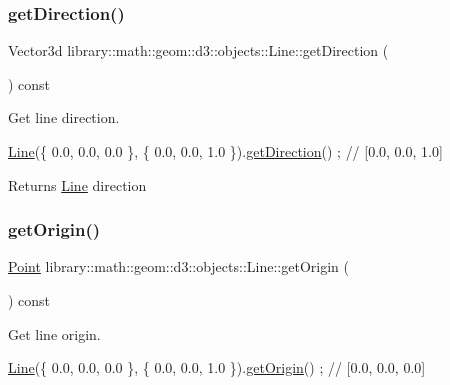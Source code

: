 \subsubsection{\texorpdfstring{get\+Direction()}{getDirection()}}
{\footnotesize\ttfamily Vector3d library\+::math\+::geom\+::d3\+::objects\+::\+Line\+::get\+Direction (\begin{DoxyParamCaption}{ }\end{DoxyParamCaption}) const}



Get line direction. 


\begin{DoxyCode}
\hyperlink{classlibrary_1_1math_1_1geom_1_1d3_1_1objects_1_1_line_a762e529453ff9ffa9233fd73737f4692}{Line}(\{ 0.0, 0.0, 0.0 \}, \{ 0.0, 0.0, 1.0 \}).\hyperlink{classlibrary_1_1math_1_1geom_1_1d3_1_1objects_1_1_line_aa108a53227e4326188fe17a03c55f9cb}{getDirection}() ; \textcolor{comment}{// [0.0, 0.0, 1.0]}
\end{DoxyCode}


\begin{DoxyReturn}{Returns}
\hyperlink{classlibrary_1_1math_1_1geom_1_1d3_1_1objects_1_1_line}{Line} direction 
\end{DoxyReturn}
\mbox{\label{classlibrary_1_1math_1_1geom_1_1d3_1_1objects_1_1_line_ad65178573d705ad21bdd54e7f4b7f104}} 
\subsubsection{\texorpdfstring{get\+Origin()}{getOrigin()}}
{\footnotesize\ttfamily \hyperlink{classlibrary_1_1math_1_1geom_1_1d3_1_1objects_1_1_point}{Point} library\+::math\+::geom\+::d3\+::objects\+::\+Line\+::get\+Origin (\begin{DoxyParamCaption}{ }\end{DoxyParamCaption}) const}



Get line origin. 


\begin{DoxyCode}
\hyperlink{classlibrary_1_1math_1_1geom_1_1d3_1_1objects_1_1_line_a762e529453ff9ffa9233fd73737f4692}{Line}(\{ 0.0, 0.0, 0.0 \}, \{ 0.0, 0.0, 1.0 \}).\hyperlink{classlibrary_1_1math_1_1geom_1_1d3_1_1objects_1_1_line_ad65178573d705ad21bdd54e7f4b7f104}{getOrigin}() ; \textcolor{comment}{// [0.0, 0.0, 0.0]}
\end{DoxyCode}


